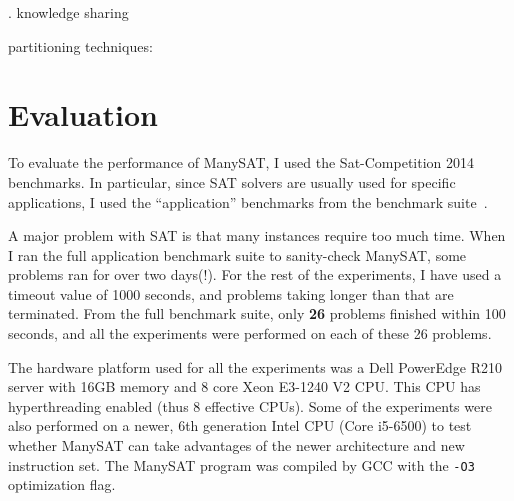 \documentclass{article}
\begin{document}















. knowledge sharing

partitioning techniques: 



\section{Evaluation}

To evaluate the performance of ManySAT, I used the Sat-Competition
2014~\cite{sc14} benchmarks. In particular, since SAT solvers are
usually used for specific applications, I used the ``application''
benchmarks from the benchmark suite~\cite{sc14-app}.


A major problem with SAT is that many instances require too much
time. When I ran the full application benchmark suite to sanity-check
ManySAT, some problems ran for over two days(!). For the rest of the
experiments, I have used a timeout value of 1000 seconds, and problems
taking longer than that are terminated. From the full benchmark suite,
only \textbf{26} problems finished within 100 seconds, and all the
experiments were performed on each of these 26 problems.


The hardware platform used for all the experiments was a Dell
PowerEdge R210 server with 16GB memory and 8 core Xeon E3-1240 V2
CPU. This CPU has hyperthreading enabled (thus 8 effective CPUs). Some
of the experiments were also performed on a newer, 6th generation
Intel CPU (Core i5-6500) to test whether ManySAT can take advantages
of the newer architecture and new instruction set. The ManySAT program
was compiled by GCC with the \texttt{-O3} optimization flag.
\end{document}

